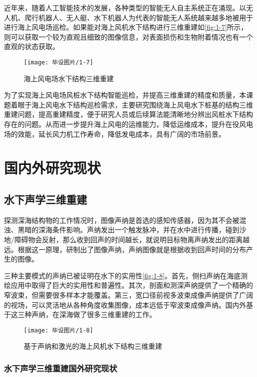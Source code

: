 近年来，随着人工智能技术的发展，各种类型的智能无人自主系统正在涌现。以无人机、爬行机器人、无人艇、水下机器人为代表的智能无人系统越来越多地被用于进行海上风电场巡检。如果能对海上风机水下结构进行三维重建如\autoref{fig:1-7}所示，则可以获取一个较为直观且细致的图像信息，对表面损伤和生物附着情况也有一个直观的状态获取。

\begin{figure}[htbp]
    \centering
    \texttt{[image: 毕设图片/1-7]}
    \caption{\label{fig:1-7}海上风电场水下结构三维重建}
\end{figure}

为了实现海上风电场风桩水下结构智能巡检，并提高三维重建的精度和质量，本课题着眼于海上风电水下结构巡检需求，主要研究围绕海上风电水下桩基的结构三维重建问题，提高重建精度，便于研究人员或后续算法能清晰地分辨出风桩水下结构存在的问题。从而进一步提升海上风电的运维能力，降低运维成本，提升在役风电场的效能，延长风力机工作寿命，降低发电成本，具有广阔的市场前景\cite{基于大数据的海上风电运维船舶智能管理系统}。

\section{国内外研究现状}
\subsection{水下声学三维重建}

探测深海结构物的工作情况时，图像声纳是首选的感知传感器，因为其不会被混浊、黑暗的深海条件影响。声纳发出一个触发脉冲，并在水中进行传播，碰到沙地/障碍物会反射，那么收到回声的时间越长，就说明目标物离声纳发出的距离越远。根据这一原理，研制出了图像声纳，声纳图像就是根据收到回声时间的分布产生的图像。

三种主要模式的声纳已被证明在水下的实用性\autoref{fig:1-8}。首先，侧扫声纳在海底测绘应用中取得了巨大的实用性和普遍性。其次，剖面和测深声纳提供了一个精确的窄波束，但需要很多样本才能覆盖。第三，宽口径前视多波束成像声纳提供了广阔的视场，可以灵活地从各种角度收集图像，成本远低于窄波束成像声纳。国内外基于这三种声纳，在深海做了很多三维重建的工作\cite{Assalih}。

\begin{figure}[htbp]
    \centering
    \texttt{[image: 毕设图片/1-8]}
    \caption{\label{fig:1-8}基于声纳和激光的海上风机水下结构三维重建}
\end{figure}

\subsubsection{水下声学三维重建国外研究现状}

